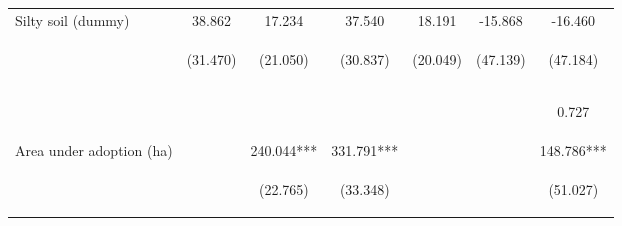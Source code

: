 \begin{center}
\begin{tabular}{lcccccc}
Silty soil (dummy) & 38.862 & 17.234 & 37.540 & 18.191 & -15.868 & -16.460 \\
 & \begin{footnotesize}(31.470)\end{footnotesize} & \begin{footnotesize}(21.050)\end{footnotesize} & \begin{footnotesize}(30.837)\end{footnotesize} & \begin{footnotesize}(20.049)\end{footnotesize} & \begin{footnotesize}(47.139)\end{footnotesize} & \begin{footnotesize}(47.184)\end{footnotesize} \\
\vspace{4pt} & \begin{footnotesize}[0.217]\end{footnotesize} & \begin{footnotesize}[0.413]\end{footnotesize} & \begin{footnotesize}[0.223]\end{footnotesize} & \begin{footnotesize}[0.364]\end{footnotesize} & \begin{footnotesize}[0.736]\end{footnotesize} & \begin{footnotesize}0.727\end{footnotesize} \\
Area under adoption (ha) &  & 240.044*** & 331.791*** &  &  & 148.786*** \\
 & \begin{footnotesize}\end{footnotesize} & \begin{footnotesize}(22.765)\end{footnotesize} & \begin{footnotesize}(33.348)\end{footnotesize} & \begin{footnotesize}\end{footnotesize} & \begin{footnotesize}\end{footnotesize} & \begin{footnotesize}(51.027)\end{footnotesize} \\

\end{tabular}
\end{center}
